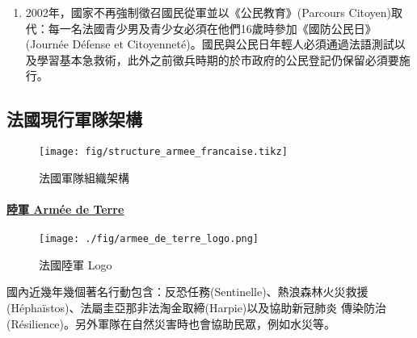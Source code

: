 \documentclass[a4paper,14pt]{extarticle}
\theoremstyle{plain}
\theoremstyle{remark}
\numberwithin{equation}{section}
\begin{document}
\begin{enumerate}
\item 2002年，國家不再強制徵召國民從軍並以《公民教育》(Parcours Citoyen)取代：每一名法國青少男及青少女必須在他們16歲時參加《國防公民日》(Journée Défense et Citoyenneté)。國民與公民日年輕人必須通過法語測試以及學習基本急救術，此外之前徵兵時期的於市政府的公民登記仍保留必須要施行。

\end{enumerate}


\subsection{法國現行軍隊架構}

\begin{figure}[H]
	\centering
  \texttt{[image: fig/structure\_armee\_francaise.tikz]}
\caption{法國軍隊組織架構}
\label{fig:structure_armee_francaise}
\end{figure}

\paragraph{\underline{陸軍 Armée de Terre}}

\begin{wrapfigure}[9]{r}{5.2cm}
  \texttt{[image: ./fig/armee\_de\_terre\_logo.png]}
  \caption{法國陸軍 Logo}
\end{wrapfigure}

國內近幾年幾個著名行動包含：反恐任務(Sentinelle)、熱浪森林火災救援(Héphaïstos)、法屬圭亞那非法淘金取締(Harpie)以及協助新冠肺炎 傳染防治(Résilience)。另外軍隊在自然災害時也會協助民眾，例如水災等。

\end{document}
